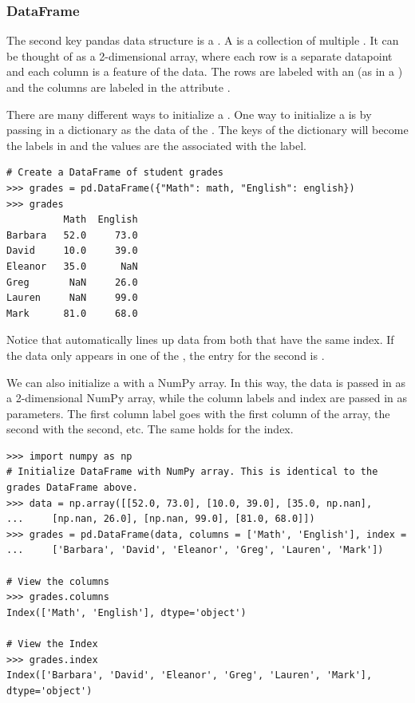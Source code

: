 \subsubsection*{DataFrame}

The second key pandas data structure is a .
A  is a collection of multiple .
It can be thought of as a 2-dimensional array, where each row is a separate datapoint and each column is a feature of the data.
The rows are labeled with an  (as in a ) and the columns are labeled in the attribute .


There are many different ways to initialize a .
One way to initialize a  is by passing in a dictionary as the data of the .
The keys of the dictionary will become the labels in  and the values are the  associated with the label.

\begin{lstlisting}
# Create a DataFrame of student grades
>>> grades = pd.DataFrame({"Math": math, "English": english})
>>> grades
	      Math  English
Barbara   52.0     73.0
David     10.0     39.0
Eleanor   35.0      NaN
Greg       NaN     26.0
Lauren     NaN     99.0
Mark      81.0     68.0
\end{lstlisting}

Notice that  automatically lines up data from both  that have the same index.
If the data only appears in one of the , the entry for the second  is .

We can also initialize a  with a NumPy array.
In this way, the data is passed in as a 2-dimensional NumPy array, while the column labels and index are passed in as parameters.
The first column label goes with the first column of the array, the second with the second, etc.
The same holds for the index.

\begin{lstlisting}
>>> import numpy as np
# Initialize DataFrame with NumPy array. This is identical to the grades DataFrame above.
>>> data = np.array([[52.0, 73.0], [10.0, 39.0], [35.0, np.nan],
...		[np.nan, 26.0], [np.nan, 99.0], [81.0, 68.0]])
>>> grades = pd.DataFrame(data, columns = ['Math', 'English'], index =
...		['Barbara', 'David', 'Eleanor', 'Greg', 'Lauren', 'Mark'])

# View the columns
>>> grades.columns
Index(['Math', 'English'], dtype='object')

# View the Index
>>> grades.index
Index(['Barbara', 'David', 'Eleanor', 'Greg', 'Lauren', 'Mark'], dtype='object')
\end{lstlisting}

